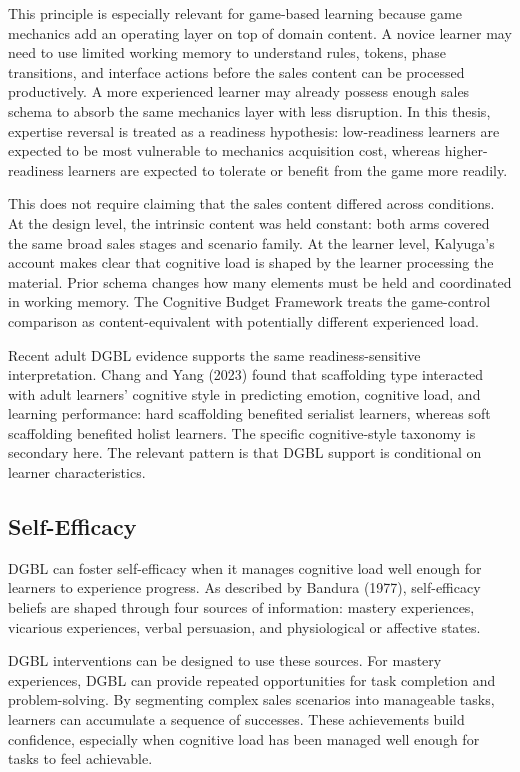 \documentclass[12pt]{report}
\begin{document}
This principle is especially relevant for game-based learning because game mechanics add an operating layer on top of domain content. A novice learner may need to use limited working memory to understand rules, tokens, phase transitions, and interface actions before the sales content can be processed productively. A more experienced learner may already possess enough sales schema to absorb the same mechanics layer with less disruption. In this thesis, expertise reversal is treated as a readiness hypothesis: low-readiness learners are expected to be most vulnerable to mechanics acquisition cost, whereas higher-readiness learners are expected to tolerate or benefit from the game more readily.

This does not require claiming that the sales content differed across conditions. At the design level, the intrinsic content was held constant: both arms covered the same broad sales stages and scenario family. At the learner level, Kalyuga's account makes clear that cognitive load is shaped by the learner processing the material. Prior schema changes how many elements must be held and coordinated in working memory. The Cognitive Budget Framework treats the game-control comparison as content-equivalent with potentially different experienced load.

Recent adult DGBL evidence supports the same readiness-sensitive interpretation. Chang and Yang (2023) found that scaffolding type interacted with adult learners' cognitive style in predicting emotion, cognitive load, and learning performance: hard scaffolding benefited serialist learners, whereas soft scaffolding benefited holist learners. The specific cognitive-style taxonomy is secondary here. The relevant pattern is that DGBL support is conditional on learner characteristics.

\subsection{Self-Efficacy}
DGBL can foster self-efficacy when it manages cognitive load well enough for learners to experience progress. As described by Bandura (1977), self-efficacy beliefs are shaped through four sources of information: mastery experiences, vicarious experiences, verbal persuasion, and physiological or affective states.

DGBL interventions can be designed to use these sources. For mastery experiences, DGBL can provide repeated opportunities for task completion and problem-solving. By segmenting complex sales scenarios into manageable tasks, learners can accumulate a sequence of successes. These achievements build confidence, especially when cognitive load has been managed well enough for tasks to feel achievable.
\end{document}
